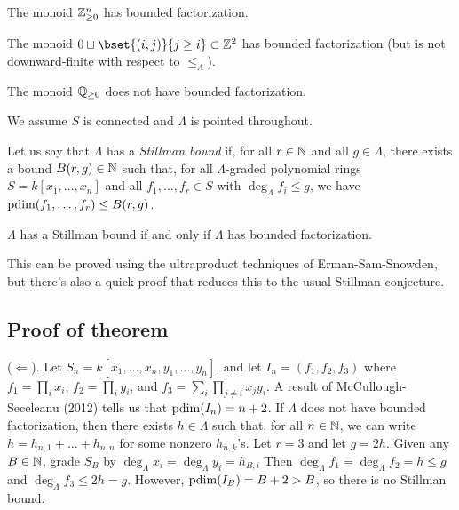 \documentclass{article}
\begin{document}
\begin{ex}
	The monoid $\mathbb{Z}^n_{\geq 0}$ has bounded factorization.
\end{ex}

\begin{ex}
	The monoid $0 \sqcup \bset{(i,j)}{j \geq i} \subset \ZZ^2$ has bounded factorization (but is not downward-finite with respect to $\leq_\Lambda$).
\end{ex}

\begin{ex}
	The monoid $\mathbb{Q}_{\geq 0}$ does not have bounded factorization.
\end{ex}

We assume $S$ is connected and $\Lambda$ is pointed throughout.

Let us say that $\Lambda$ has a \emph{Stillman bound} if, for all $r \in \mathbb{N}$ and all $g \in \Lambda$, there exists a bound $B(r, g) \in \mathbb{N}$ such that, for all $\Lambda$-graded polynomial rings $S = k[x_1, \dots, x_n]$ and all $f_1, \dots, f_r \in S$ with $\deg_\Lambda f_i \leq g$, we have $\operatorname{pdim}(f_1, \dots, f_r) \leq B(r, g)$.

\begin{thm}
	$\Lambda$ has a Stillman bound if and only if $\Lambda$ has bounded factorization.
\end{thm}

This can be proved using the ultraproduct techniques of Erman-Sam-Snowden, but there's also a quick proof that reduces this to the usual Stillman conjecture.

\subsection{Proof of theorem}

($\Leftarrow$).
Let $S_n = k[x_1, \dots, x_n, y_1, \dots, y_n]$, and let $I_n = (f_1, f_2, f_3)$ where $f_1 = \prod_i x_i$, $f_2 = \prod_i y_i$, and $f_3 = \sum_i \prod_{j \neq i} x_j y_i$.
A result of McCullough-Seceleanu (2012) tells us that $\operatorname{pdim}(I_n) = n + 2$.
If $\Lambda$ does not have bounded factorization, then there exists $h \in \Lambda$ such that, for all $n \in \mathbb{N}$, we can write $h = h_{n,1} + \dots + h_{n,n}$ for some nonzero $h_{n,k}$'s.
Let $r = 3$ and let $g = 2h$.
Given any $B \in \mathbb{N}$, grade $S_B$ by $\deg_\Lambda x_i = \deg_\Lambda y_i = h_{B,i}$
Then $\deg_\Lambda f_1 = \deg_\Lambda f_2 = h \leq g$ and $\deg_\Lambda f_3 \leq 2h = g$.
However, $\operatorname{pdim}(I_B) = B + 2 > B$, so there is no Stillman bound.
\end{document}
